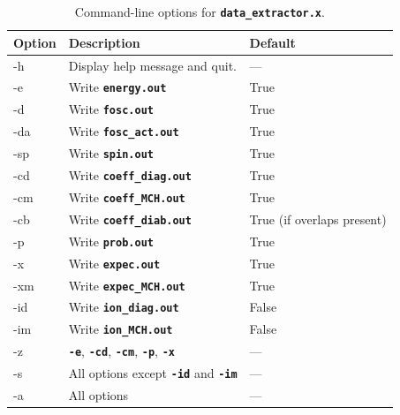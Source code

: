\documentclass[a4paper,10pt,DIV=15,openany]{scrbook}
\newcommand{\ttt}[1]{\textbf{\texttt{#1}}}
\begin{document}
\begin{table}[tb]
  \centering
  \caption{Command-line options for \ttt{data\_extractor.x}.}
  \label{tab:dataextractor_options}
  \begin{tabular}{>{\ttfamily}lll}
    \hline
    \rmfamily Option        &Description      &Default\\
    \hline
    -h          &Display help message and quit.                         &---                      \\
    -e          &Write \ttt{energy.out}                                 &True                     \\
    -d          &Write \ttt{fosc.out}                                   &True                     \\
    -da         &Write \ttt{fosc\_act.out}                              &True                     \\
    -sp         &Write \ttt{spin.out}                                   &True                     \\
    -cd         &Write \ttt{coeff\_diag.out}                            &True                     \\
    -cm         &Write \ttt{coeff\_MCH.out}                             &True                     \\
    -cb         &Write \ttt{coeff\_diab.out}                            &True (if overlaps present) \\
    -p          &Write \ttt{prob.out}                                   &True                     \\
    -x          &Write \ttt{expec.out}                                  &True                     \\
    -xm         &Write \ttt{expec\_MCH.out}                             &True                     \\
    -id         &Write \ttt{ion\_diag.out}                              &False                    \\
    -im         &Write \ttt{ion\_MCH.out}                               &False                    \\
    -z          &\ttt{-e}, \ttt{-cd}, \ttt{-cm}, \ttt{-p}, \ttt{-x}     &---                      \\
    -s          &All options except \ttt{-id} and \ttt{-im}             &---                      \\
    -a          &All options                                            &---                      \\
    \hline
  \end{tabular}
\end{table}
\end{document}
